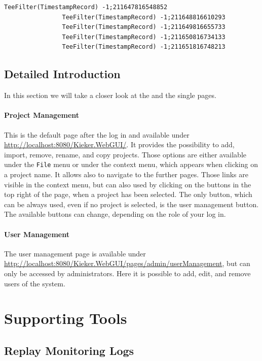 			\setTextListing
			\begin{lstlisting}[gobble = 8, label=lst:webgui-analysis-example, caption=Execution of the example analysis]
				TeeFilter(TimestampRecord) -1;211647816548852
				TeeFilter(TimestampRecord) -1;211648816610293
				TeeFilter(TimestampRecord) -1;211649816655733
				TeeFilter(TimestampRecord) -1;211650816734133
				TeeFilter(TimestampRecord) -1;211651816748213
			\end{lstlisting}
			
		\subsection{Detailed Introduction}
		
			In this section we will take a closer look at the \KiekerWebGUI{} and the single pages.
			
			\paragraph*{Project Management}
			
			This is the default page after the log in and available under \url{http://localhost:8080/Kieker.WebGUI/}. It provides the possibility to add, import, remove, rename, and copy projects. Those options are either available under the \texttt{File} menu or under the context menu, which appears when clicking on a project name. It allows also to navigate to the further pages. Those links are visible in the context menu, but can also used by clicking on the buttons in the top right of the page, when a project has been selected. The only button, which can be always used, even if no project is selected, is the user management button. The available buttons can change, depending on the role of your log in.
			
			\paragraph*{User Management}
			
			The user management page is available under \url{http://localhost:8080/Kieker.WebGUI/pages/admin/userManagement}, but can only be accessed by administrators. Here it is possible to add, edit, and remove users of the system.
			
	\section{Supporting Tools}
		\subsection{Replay Monitoring Logs}
		
